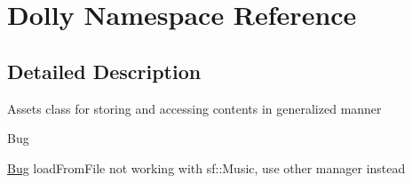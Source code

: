 \hypertarget{namespace_dolly}{}\section{Dolly Namespace Reference}
\label{namespace_dolly}


\subsection{Detailed Description}
Assets class for storing and accessing contents in generalized manner \begin{DoxyRefDesc}{Bug}
\item[\hyperlink{bug__bug000001}{Bug}]load\+From\+File not working with sf\+::\+Music, use other manager instead \end{DoxyRefDesc}
